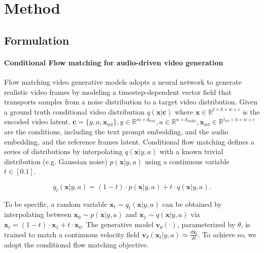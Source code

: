 \section{Method}
\subsection{Formulation}
\paragraph{Conditional Flow matching for audio-driven video generation}
Flow matching video generative models \cite{flowmatching, chen2025hunyuanvideo, wan} adopts a neural network to generate realistic video frames by modeling a timestep-dependent vector field that transports samples from a noise distribution to a target video distribution. Given a ground truth conditional video distribution $q(\boldsymbol{x} \vert \boldsymbol{c})$ where $\boldsymbol{x} \in \mathbb{R}^{t \times h \times w \times c}$ is the encoded video latent. $\boldsymbol{c} = \{y, a, \boldsymbol{x}_{\mathrm{ref}}\}, y \in \mathbb{R}^{m \times d_{\mathrm{text}}}, a \in \mathbb{R}^{n \times d_{\mathrm{audio}}}, \boldsymbol{x}_{\mathrm{ref}} \in \mathbb{R}^{t_{\mathrm{ref}} \times h\times w \times c}$ are the conditions, including the text prompt embedding, and the audio embedding, and the reference frames latent. Conditional flow matching defines a series of distributions by interpolating $q(\boldsymbol{x} \vert y, a)$ with a known trivial distribution (e.g. Gaussian noise) $p(\boldsymbol{x} \vert y, a)$ using a continuous variable $t \in [0. 1]$.

\begin{equation}
q_t(\boldsymbol{x} \vert y, a) = (1 - t) \cdot p(\boldsymbol{x} \vert y, a) + t \cdot q(\boldsymbol{x} \vert y, a).
\end{equation}

To be specific, a random variable $\boldsymbol{x}_t \sim q_t(\boldsymbol{x} \vert y, a)$ can be obtained by interpolating between $\boldsymbol{x}_0 \sim p(\boldsymbol{x} \vert y, a)$ and $\boldsymbol{x}_1 \sim q(\boldsymbol{x} \vert y, a)$ via $\boldsymbol{x}_t = (1 - t) \cdot \boldsymbol{x}_1 + t \cdot \boldsymbol{x}_0$. The generative model $\boldsymbol{v}_\theta(\cdot)$, parameterized by $\theta$, is trained to match a continuous velocity field $\boldsymbol{v}_\theta(\boldsymbol{x}_t \vert y, a) \simeq \frac{d \boldsymbol{x}_t}{d t}$. To achieve so, we adopt the conditional flow matching objective. 


